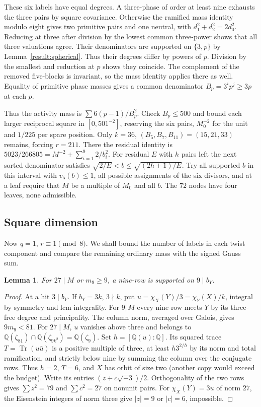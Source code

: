 \documentclass[11pt]{amsart}
\numberwithin{equation}{section}
\newtheorem{lemma}[theorem]{Lemma}
\theoremstyle{definition}
\theoremstyle{plain}
\DeclareMathOperator{\Tr}{Tr}
\newcommand{\QQ}{\mathbb Q}
\begin{document}
These six labels have equal degrees. A three-phase of order at least
nine exhausts the three pairs by square covariance. Otherwise the
ramified mass identity modulo eight gives two primitive pairs and
one neutral, with $d_1^2+d_2^2=2d_0^2$. Reducing at three after division
by the lowest common three-power shows that all three valuations agree.
Their denominators are supported on $\{3,p\}$ by
Lemma~\ref{result:spherical}. Thus their degrees differ by powers of
$p$. Division by the smallest and reduction at $p$ shows they coincide.
The complement of the removed five-blocks is invariant, so the mass
identity applies there as well. Equality of primitive phase masses
gives a common denominator $B_p=3^i p^j\ge3p$ at each $p$.

Thus the activity mass is $\sum 6(p-1)/B_p^2$. Check $B_p\le500$ and
bound each larger reciprocal square in $[0,501^{-2}]$, reserving the
six pairs, $M_0^{-2}$ for the unit and $1/225$ per spare position.
Only $k=36$, $(B_5,B_7,B_{11})=(15,21,33)$ remains, forcing $r=211$.
There the residual identity is
$5023/266805=M^{-2}+\sum_{i=1}^{9}2/b_i^2$. For residual $E$ with
$h$ pairs left the next sorted denominator satisfies
$\sqrt{2/E}<b\le\sqrt{(2h+1)/E}$. Try all supported $b$ in this interval
with $v_5(b)\le1$, all possible assignments of the six divisors, and at
a leaf require that $M$ be a multiple of $M_0$ and all $b$.
The $72$ nodes have four leaves, none admissible.

\subsection{Square dimension}
Now $q=1$, $r\equiv1\pmod8$. We shall bound the number of labels in
each twist component and compare the remaining ordinary mass with the signed Gauss sum.

\begin{lemma}\label{odd:nine-support}
For $27\mid M$ or $m_9\ge9$, a nine-row is supported on $9\mid b_Y$.
\end{lemma}
\begin{proof}
At a hit $3\mid b_Y$. If $b_Y=3k$, $3\nmid k$, put
$u=\chi_X(Y)/3=\chi_Y(X)/k$, integral by symmetry and lcm integrality.
For $9\Vert M$ every nine-row meets $Y$ by its three-free degree
and principality. The column norm, averaged over Galois, gives $9m_9<81$.
For $27\mid M$, $u$ vanishes above three and belongs to
$\QQ(\zeta_{81})\cap\QQ(\zeta_{9k^2})=\QQ(\zeta_9)$.
Set $h=[\QQ(u):\QQ]$. Its squared trace
$T=\Tr(u\bar u)$ is a positive multiple of three, at least $h3^{2/h}$
by its norm and total ramification, and strictly below nine by summing
the column over the conjugate rows. Thus $h=2$, $T=6$, and $X$ has
orbit of size two (another copy would exceed the budget).
Write its entries $(z+c\sqrt{-3})/2$. Orthogonality of the two rows
gives $\sum z^2=79$ and $\sum c^2=27$ on nonunit pairs. For
$\chi_X(Y)=3u$ of norm $27$, the Eisenstein integers of norm three give
$|z|=9$ or $|c|=6$, impossible.
\end{proof}
\end{document}
